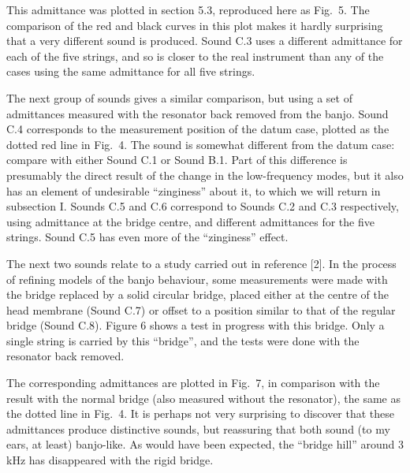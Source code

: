   This admittance was plotted in section 5.3, reproduced here as Fig.\ 5. The 
  comparison of the red and black curves in this plot makes it hardly 
  surprising that a very different sound is produced. Sound C.3 uses a 
  different admittance for each of the five strings, and so is closer to the 
  real instrument than any of the cases using the same admittance for all five 
  strings. 


  The next group of sounds gives a similar comparison, but using a set of 
  admittances measured with the resonator back removed from the banjo. Sound 
  C.4 corresponds to the measurement position of the datum case, plotted as the 
  dotted red line in Fig.\ 4. The sound is somewhat different from the datum 
  case: compare with either Sound C.1 or Sound B.1. Part of this difference is 
  presumably the direct result of the change in the low-frequency modes, but it 
  also has an element of undesirable ``zinginess'' about it, to which we will 
  return in subsection I. Sounds C.5 and C.6 correspond to Sounds C.2 and C.3 
  respectively, using admittance at the bridge centre, and different 
  admittances for the five strings. Sound C.5 has even more of the 
  ``zinginess'' effect. 

  The next two sounds relate to a study carried out in reference [2]. In the 
  process of refining models of the banjo behaviour, some measurements were 
  made with the bridge replaced by a solid circular bridge, placed either at 
  the centre of the head membrane (Sound C.7) or offset to a position similar 
  to that of the regular bridge (Sound C.8). Figure 6 shows a test in progress 
  with this bridge. Only a single string is carried by this ``bridge'', and the 
  tests were done with the resonator back removed. 


  The corresponding admittances are plotted in Fig.\ 7, in comparison with the 
  result with the normal bridge (also measured without the resonator), the same 
  as the dotted line in Fig.\ 4. It is perhaps not very surprising to discover 
  that these admittances produce distinctive sounds, but reassuring that both 
  sound (to my ears, at least) banjo-like. As would have been expected, the 
  ``bridge hill'' around 3 kHz has disappeared with the rigid bridge. 

